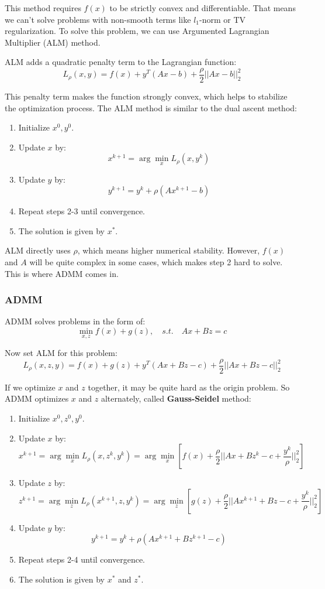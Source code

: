 \documentclass[12pt]{ctexart}
\begin{document}
This method requires $f(x)$ to be strictly convex and differentiable. That means
we can't solve problems with non-smooth terms like $l_1$-norm or TV regularization.
To solve this problem, we can use Argumented Lagrangian Multiplier (ALM) method.

ALM adds a quadratic penalty term to the Lagrangian function:
\[
  L_\rho(x, y) = f(x) + y^T (Ax - b) + \frac{\rho}{2} ||Ax - b||_2^2
\]

This penalty term makes the function strongly convex, which helps to stabilize the
optimization process. The ALM method is similar to the dual ascent method:
\begin{enumerate}
  \item Initialize $x^0, y^0$.
  \item Update $x$ by:
  \[
    x^{k+1} = \arg\min_x L_\rho(x, y^k)
  \]
  \item Update $y$ by:
  \[
    y^{k+1} = y^k + \rho (Ax^{k+1} - b)
  \]
  \item Repeat steps 2-3 until convergence.
  \item The solution is given by $x^*$.
\end{enumerate}

ALM directly uses $\rho$, which means higher numerical stability. However, $f(x)$
and $A$ will be quite complex in some cases, which makes step 2 hard to solve.
This is where ADMM comes in.

\subsubsection{\textbf{ADMM}}

ADMM solves problems in the form of:
\[
  \min_{x,z} f(x) + g(z), \quad s.t. \quad Ax + Bz = c
\]

Now set ALM for this problem:
\[
  L_\rho(x, z, y) = f(x) + g(z) + y^T (Ax + Bz - c) + \frac{\rho}{2}
  ||Ax + Bz - c||_2^2
\]

If we optimize $x$ and $z$ together, it may be quite hard as the origin problem.
So ADMM optimizes $x$ and $z$ alternately, called \textbf{Gauss-Seidel} method:
\begin{enumerate}
  \item Initialize $x^0, z^0, y^0$.
  \item Update $x$ by:
  \[
    x^{k+1} = \arg\min_x L_\rho(x, z^k, y^k) = \arg\min_x\left[ f(x) + \frac{\rho}{2}
    ||Ax + Bz^k - c + \frac{y^k}{\rho}||_2^2\right]
  \]
  \item Update $z$ by:
  \[
    z^{k+1} = \arg\min_z L_\rho(x^{k+1}, z, y^k) = \arg\min_z\left[ g(z) + \frac{\rho}{2}
    ||Ax^{k+1} + Bz - c + \frac{y^k}{\rho}||_2^2\right]
  \]
  \item Update $y$ by:
  \[
    y^{k+1} = y^k + \rho (Ax^{k+1} + Bz^{k+1} - c)
  \]
  \item Repeat steps 2-4 until convergence.
  \item The solution is given by $x^*$ and $z^*$.
\end{enumerate}
\end{document}
